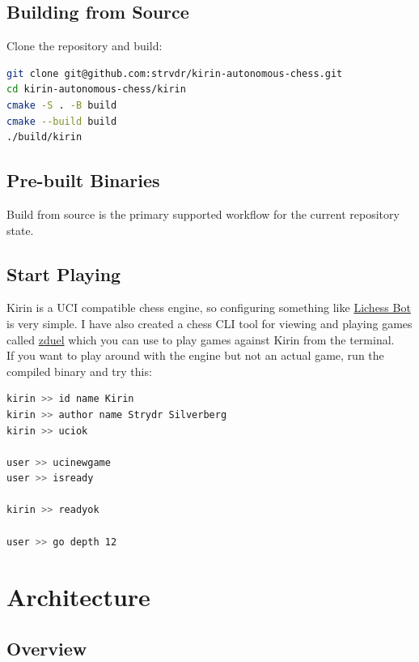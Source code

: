 \documentclass[11pt,a4paper]{report}
\begin{document}
\section{Building from Source}

Clone the repository and build:

\begin{lstlisting}[language=bash]
git clone git@github.com:strvdr/kirin-autonomous-chess.git
cd kirin-autonomous-chess/kirin
cmake -S . -B build
cmake --build build
./build/kirin
\end{lstlisting}

\section{Pre-built Binaries}

Build from source is the primary supported workflow for the current repository state.

\section{Start Playing}
Kirin is a UCI compatible chess engine, so configuring something like \href{https://github.com/lichess-bot-devs/lichess-bot}{Lichess Bot} is very simple. I have also created a chess CLI tool for viewing and playing games called \href{https://github.com/strvdr/zduel}{zduel} which you can use to play games against Kirin from the terminal.\\

If you want to play around with the engine but not an actual game, run the compiled binary and try this:
\begin{lstlisting}[language=bash]
kirin >> id name Kirin
kirin >> author name Strydr Silverberg
kirin >> uciok

user >> ucinewgame
user >> isready

kirin >> readyok

user >> go depth 12
\end{lstlisting}

\chapter{Architecture}

\section{Overview}
\end{document}
